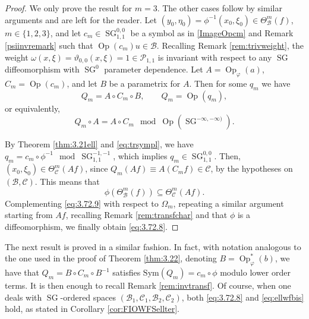 \documentclass[12pt,a4paper,reqno]{amsart}
\numberwithin{equation}{section}
\numberwithin{thm}{section}
\theoremstyle{definition}
\theoremstyle{remark}
\begin{document}
\par

\begin{proof}
We only prove the result for $m=3$. The other cases follow
by similar arguments and are left for the reader.
Let $(y_{0}, \eta_{0})=\phi^{-1}(x_{0}, \xi_{0})\in\Theta ^m_{{\mathcal B}} (f)$,
$m\in\{1,2,3\}$, and  let $c_m \in {\operatorname{SG}}^{0,0}_{1,1}$ be a symbol as
in \eqref{ImageOpcm} and Remark \ref{psiinvremark}
such that ${\operatorname{Op}}(c_m) u \in {{\mathcal B}}$. Recalling Remark \ref{rem:trivweight}, the weight 
$\omega(x,\xi)=\vartheta_{0,0}(x,\xi)=1\in\mathscr{P}_{1,1}$ is invariant with respect to any
${\operatorname{SG}}$ diffeomorphism with ${\operatorname{SG}}^0$ parameter dependence.
Let $A={\operatorname{Op}}_\varphi(a)$, $C_m={\operatorname{Op}}(c_m)$, and let $B$ be a
parametrix for $A$. 
Then for some $q_m$ we have
$$
Q_m = A\circ C_m \circ B,\qquad Q_m={\operatorname{Op}} (q_m),
$$
or equivalently,
$$
Q_m\circ A = A\circ C_m\mod {\operatorname{Op}} ({\operatorname{SG}} ^{-\infty,-\infty)}).
$$

\par

By Theorem \ref{thm:3.21ell} and \eqref{eq:trsympl}, we have
$q_m = c_m \circ \phi^{-1}\mod {\operatorname{SG}} ^{-1,-1}_{1,1}$, which implies
$q_m\in{\operatorname{SG}}^{0,0}_{1,1}$. Then, 
$(x_{0}, \xi_{0})\in \Theta ^m_{{\mathcal C}} (Af)$, since $Q_m (A f) \equiv A(C_mf)
\in {{\mathcal C}}$, by the hypotheses on $({{\mathcal B}},{{\mathcal C}})$. This means that
\begin{equation}
\label{eq:3.72.9}
\phi(\Theta ^{m}_{{\mathcal B}}(f)) \subseteq \Theta ^{m} _{{\mathcal C}}(Af).
\end{equation}
Complementing \eqref{eq:3.72.9} with respect to $\Omega_m$,
repeating a similar argument starting
from $Af$, recalling Remark \ref{rem:transfchar} and that $\phi$
is a diffeomorphism,
we finally obtain \eqref{eq:3.72.8}.
\end{proof}

\par

The next result is proved in a similar fashion. In fact, with 
notation analogous to the one used in the proof of Theorem
\ref{thm:3.22}, denoting $B={\operatorname{Op}} ^*_\varphi(b)$,
we have that $Q_m=B\circ C_m\circ B^{-1}$ satisfies
${\mathrm{Sym}\left({Q_m}\right)}=c_m\circ\phi$ modulo lower order terms.
It is then enough to recall Remark \ref{rem:invtransf}.
Of course, when one deals with ${\operatorname{SG}}$-ordered spaces
$({{\mathcal B}}_1,{{\mathcal C}}_1,{{\mathcal B}}_2, {{\mathcal C}}_2)$, both \eqref{eq:3.72.8}
and \eqref{eq:ellwfbis} hold, as stated in Corollary
\ref{cor:FIOWFSellter}.
\end{document}
